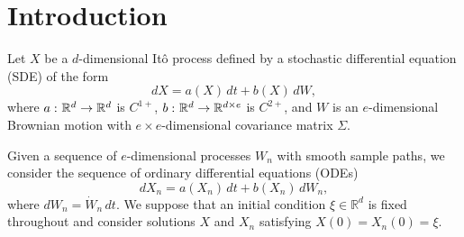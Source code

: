 \documentclass[aop,MSNbibl,seceqn,dvips]{arximspdf}
\newcommand{\R}{\mathbb{R}}
\begin{document}
\begin{frontmatter}
\begin{abstract}
In applications, a natural class of smooth approximations arise by setting
$W_n(t)=n^{-1/2}\int_0^{nt}v\circ\phi_s \,ds$ where $\phi_t$ is a flow
(generated, e.g., by an ordinary differential equation) and $v$
is a mean zero observable.
Under mild conditions on $\phi_t$, we give a definitive answer to the
interpretation question for the stochastic integral $\int b(X) \,dW$.
Our theory applies to Anosov or Axiom~A flows $\phi_t$, as well as to a
large class of nonuniformly hyperbolic flows (including the one defined
by the well-known Lorenz equations) and our main results do not require
any mixing assumptions on $\phi_t$.

The methods used in this paper are a combination of rough path theory
and smooth ergodic theory.
\end{abstract}

%
\begin{keyword}[class=AMS]
\end{keyword}

\begin{keyword}
\end{keyword}
%
\end{frontmatter}

\section{Introduction}
\label{sec-intro}

Let $X$ be a $d$-dimensional It\^o process defined by a stochastic
differential equation (SDE) of the form
%
\begin{equation}
\label{eq-IP} dX=a(X) \,dt+b(X) \,dW,
\end{equation}
%
where $a\dvtx\R^d\to\R^d$ is $C^{1+}$, $b\dvtx\R^d\to\R
^{d\times e}$ is $C^{2+}$,
and $W$ is an $e$-dimensional Brownian motion with $e\times e$-dimensional
covariance matrix $\Sigma$.

Given a sequence of $e$-dimensional processes $W_n$ with smooth sample
paths, we consider the sequence of ordinary differential equations (ODEs)
%
\begin{equation}
\label{eq-ODE} dX_n=a(X_n) \,dt+b(X_n)
\,dW_n,
\end{equation}
%
where $dW_n=\dot W_n \,dt$.
We suppose that an initial condition $\xi\in\R^d$ is fixed throughout
and consider solutions $X$ and $X_n$ satisfying $X(0)=X_n(0)=\xi$.
\end{document}
